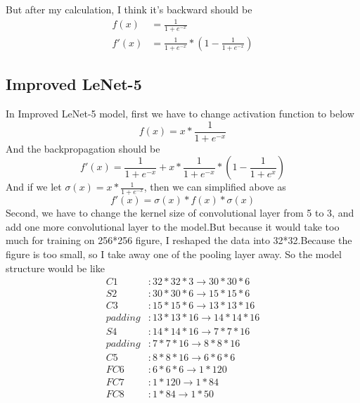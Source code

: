 \documentclass[conference]{IEEEtran}
\begin{document}
    But after my calculation, I think it's backward should be 
    \begin{equation}
        \begin{aligned}
            f(x) &= \frac{1}{1 + e^{-x}} \\
            f'(x) &= \frac{1}{1 + e^{-x}} * (1 - \frac{1}{1 + e^{-x}})
        \end{aligned}
    \end{equation}
    
    \subsection{Improved LeNet-5}
    In Improved LeNet-5 model, first we have to change activation function to below
    \begin{equation}
        f(x) = x * \frac{1}{1 + e^{-x}}
    \end{equation}
    And the backpropagation should be 
    \begin{equation}
        f'(x) = \frac{1}{1 + e^{-x}} + x * \frac{1}{1 + e^{-x}} * (1 - \frac{1}{1 + e^{x}})
    \end{equation}
    And if we let $\sigma(x) = x * \frac{1}{1 + e^{-x}}$, then we can simplified above as
    \begin{equation}
        f'(x) = \sigma(x) * f(x) * \sigma(x)
    \end{equation}
    Second, we have to change the kernel size of convolutional layer from 5 to 3, and add one more convolutional layer to the model.But because it would take too much for training on 256*256 figure, I reshaped the data into 32*32.Because the figure is too small, so I take away one of the pooling layer away. So the model structure would be like
    \begin{equation}
    \begin{aligned}
        C1 &: 32*32*3 \rightarrow 30*30*6 \\
        S2 &: 30*30*6 \rightarrow 15*15*6 \\
        C3 &: 15*15*6 \rightarrow 13*13*16 \\
        padding &: 13*13*16 \rightarrow 14*14*16 \\
        S4 &: 14*14*16 \rightarrow 7*7*16 \\
        padding &: 7*7*16 \rightarrow 8*8*16 \\
        C5 &: 8*8*16 \rightarrow 6*6*6 \\
        FC6 &: 6*6*6 \rightarrow 1*120 \\
        FC7 &: 1*120 \rightarrow 1*84 \\
        FC8 &: 1*84 \rightarrow 1*50
    \end{aligned}
    \end{equation}
\end{document}
